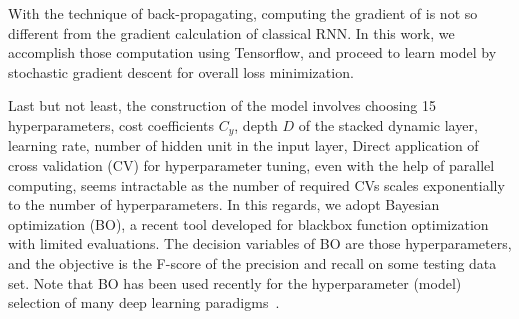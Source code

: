 With the technique of back-propagating, computing the gradient of \modelname is not so different from the gradient calculation of classical RNN.
In this work, we accomplish those computation using Tensorflow, and proceed to learn \modelname model by stochastic gradient descent for overall loss minimization.

Last but not least, the construction of the \modelname model involves choosing 15 hyperparameters, \eg cost coefficients $C_{y}$, depth $D$ of the stacked dynamic layer, learning rate, number of hidden unit in the input layer, \etc
Direct application of cross validation (CV) for hyperparameter tuning, even with the help of parallel computing, seems intractable as the number of required CVs scales exponentially to the number of hyperparameters.
In this regards, we adopt Bayesian optimization (BO), a recent tool developed for blackbox function optimization with limited evaluations.
The decision variables of BO are those hyperparameters, and the objective is the F-score of the precision and recall on some testing data set.
Note that BO has been used recently for the hyperparameter (model) selection of many deep learning paradigms~\cite{snoek2012practical}\cite{NIPS2016}.



